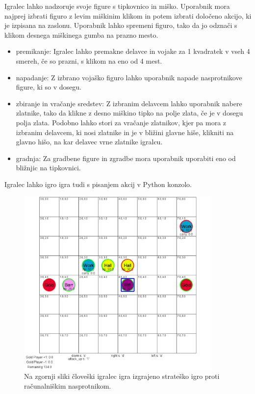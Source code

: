 \documentclass[a4paper, 12pt]{book}
\begin{document}
{Igralec lahko nadzoruje svoje figure s tipkovnico in miško.
Uporabnik mora najprej izbrati figuro z levim miškinim klikom in potem izbrati določeno akcijo, ki je izpisana na zaslonu. 
Uporabnik lahko spremeni figuro, tako da jo odznači s klikom desnega miškinega gumba na prazno mesto.

\begin{itemize}
	\item premikanje: Igralec lahko premakne delavce in vojake za 1 kvadratek v vseh 4 smereh, če so prazni, s klikom na eno od 4 mest.
	\item napadanje: Z izbrano vojaško figuro lahko uporabnik napade nasprotnikove figure, ki so v dosegu.
	\item zbiranje in vračanje sredstev: Z izbranim delavcem lahko uporabnik nabere zlatnike, tako da klikne z desno miškino tipko na polje zlata, če je v dosegu polja zlata.
	Podobno lahko stori za vračanje zlatnikov, kjer pa mora z izbranim delavcem, ki nosi zlatnike in je v bližini glavne hiše, klikniti na glavno hišo, na kar delavec vrne zlatnike igralcu.
	\item gradnja: Za gradbene figure in zgradbe mora uporabnik uporabiti eno od bližnjic na tipkovnici.
\end{itemize}
\noindent
Igralec lahko igro igra tudi s pisanjem akcij v Python konzolo.

\begin{figure}[h!]
	\begin{center}
		\includegraphics[width=0.9\textwidth]{photos/visualization_pygame.pdf}
	\end{center}
	\caption{Na zgornji sliki človeški igralec igra izgrajeno strateško igro proti računalniškim nasprotnikom.}
	\label{visualization_pygame}
\end{figure}

}
\end{document}
